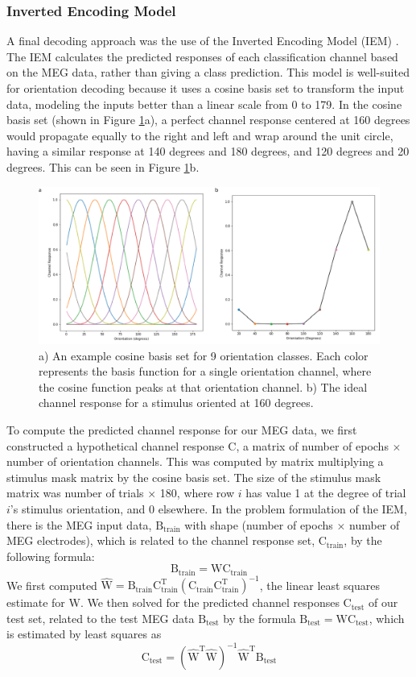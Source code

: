 \documentclass[../main.tex]{subfiles}
\begin{document}
\subsubsection{Inverted Encoding Model}
A final decoding approach was the use of the Inverted Encoding Model (IEM) \citep{Brouwer09, Brouwer, GARCIA2013515,sprague_serences_2013, sprague_saproo_serences_2015}. The IEM calculates the predicted responses of each classification channel based on the MEG data, rather than giving a class prediction. This model is well-suited for orientation decoding because it uses a cosine basis set to transform the input data, modeling the inputs better than a linear scale from 0 to 179. In the cosine basis set (shown in Figure \ref{basis_set}a), a perfect channel response centered at 160 degrees would propagate equally to the right and left and wrap around the unit circle, having a similar response at 140 degrees and 180 degrees, and 120 degrees and 20 degrees. This can be seen in Figure \ref{basis_set}b.

\begin{figure}
    \centering
    \includegraphics[scale=0.7]{figures/methods/basis_set.png}
    \caption{a) An example cosine basis set for 9 orientation classes. Each color represents the basis function for a single orientation channel, where the cosine function peaks at that orientation channel. b) The ideal channel response for a stimulus oriented at 160 degrees.}
    \label{basis_set}
\end{figure}

To compute the predicted channel response for our MEG data, we first constructed a hypothetical channel response $\mathrm{C}$, a matrix of number of epochs $\times$ number of orientation channels. This was computed by matrix multiplying a stimulus mask matrix by the cosine basis set. The size of the stimulus mask matrix was number of trials $\times$ 180, where row $i$ has value 1 at the degree of trial $i$'s stimulus orientation, and 0 elsewhere. In the problem formulation of the IEM, there is the MEG input data, $\mathrm{B_{train}}$ with shape (number of epochs $\times$ number of MEG electrodes), which is related to the channel response set, $\mathrm{C_{train}}$, by the following formula:
$$ \mathrm{B_{train} = W C_{train}}$$
We first computed $\mathrm{\hat{W} = B_{train} C_{train}^T (C_{train} C_{train}^T)^{-1}}$, the linear least squares estimate for W. We then solved for the predicted channel responses $\mathrm{C_{test}}$  of our test set, related to the test MEG data $\mathrm{B_{test}}$ by the formula $\mathrm{B_{test} = W C_{test}}$, which is estimated by least squares as 
$$\mathrm{C_{test} = (\hat{W}^T \hat{W})^{-1} \hat{W}^T B_{test}}$$
\end{document}

